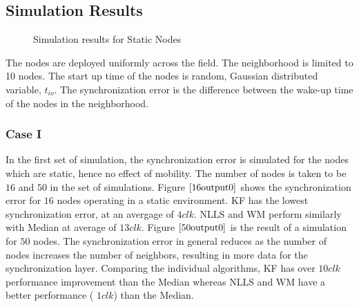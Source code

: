 \documentclass[journal]{IEEEtran}
\begin{document}
\subsection{\textbf{Simulation Results}}
\begin{figure}
\centerline{
\hfil
{}}
\caption{Simulation results for Static Nodes }
\label{static}
\end{figure}
The nodes are deployed uniformly across the field. The neighborhood is limited
to 10 nodes. The start up time of the
nodes is random, Gaussian distributed variable, $t_{io}$. The
synchronization error is the difference between the wake-up time of the nodes in the
neighborhood.
\subsubsection{\textbf{Case I}} In the first set of simulation, the
synchronization error is simulated for the nodes which are static,
hence no effect of mobility. The number of nodes is taken to be $16$
and $50$ in the set of simulations.
\newline Figure $\ref{16output0}$
shows the synchronization error for $16$ nodes operating in a static
environment. KF has the lowest synchronization error, at an avergage
of $4clk$. NLLS and WM perform similarly with Median at average of
$13clk$. \newline Figure $\ref{50output0}$ is the result of a
simulation for $50$ nodes. The synchronization error in general
reduces as the number of nodes increases the number of neighbors,
resulting in more data for the synchronization layer. Comparing the
individual algorithms, KF has over $10clk$ performance improvement
than the Median whereas NLLS and WM have a better performance (
$1clk$) than the Median.
\end{document}

